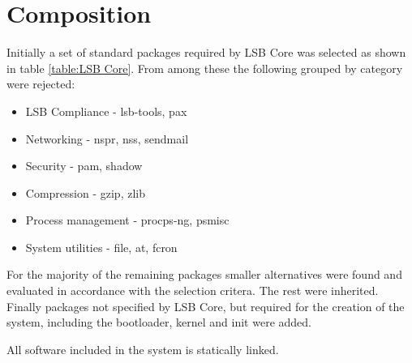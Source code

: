 \section{Composition}\label{Composition}

Initially a set of standard packages required by LSB Core was selected as shown in table \ref{table:LSB Core}. From among these the following grouped by category were rejected:

\begin{itemize}
    \item LSB Compliance - lsb-tools, pax
    \item Networking - nspr, nss, sendmail
    \item Security - pam, shadow
    \item Compression - gzip, zlib
    \item Process management - procps-ng, psmisc
    \item System utilities - file, at, fcron
\end{itemize}

For the majority of the remaining packages smaller alternatives were found and evaluated in accordance with the selection critera. The rest were inherited. Finally packages not specified by LSB Core, but required for the creation of the system, including the bootloader, kernel and init were added.

All software included in the system is statically linked.

\newpage

\newpage

\newpage
